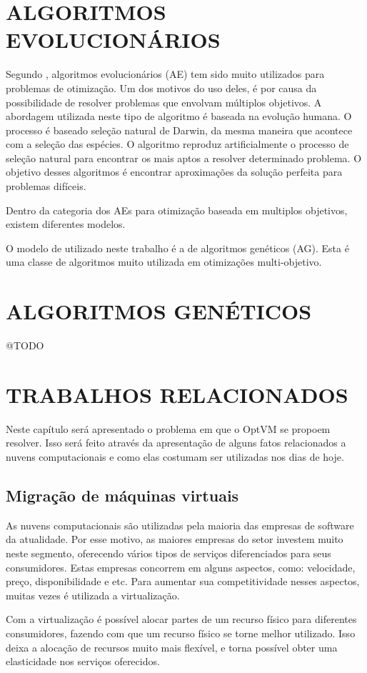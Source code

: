 \section{ALGORITMOS EVOLUCIONÁRIOS}
Segundo \cite{ticona}, algoritmos evolucionários (AE) tem sido muito utilizados para problemas de 
otimização. Um dos motivos do uso deles, é por causa da possibilidade de resolver problemas que 
envolvam múltiplos objetivos. A abordagem utilizada neste tipo de algoritmo é baseada na 
evolução humana. O processo é baseado seleção natural de Darwin, da mesma maneira que acontece com a 
seleção das espécies. O algoritmo reproduz artificialmente o processo de seleção natural para 
encontrar os mais aptos a resolver determinado problema. O objetivo desses algoritmos é 
encontrar aproximações da solução perfeita para problemas difíceis. 

Dentro da categoria dos AEs para otimização baseada em multiplos objetivos, existem diferentes modelos. 

O modelo de utilizado neste trabalho é a de algoritmos genéticos (AG). Esta é uma classe de 
algoritmos muito utilizada em otimizações multi-objetivo. 

\section{ALGORITMOS GENÉTICOS}
@TODO

\section{TRABALHOS RELACIONADOS}
Neste capítulo será apresentado o problema em que o OptVM se propoem resolver. 
Isso será feito através da apresentação de alguns fatos relacionados a nuvens computacionais 
e como elas costumam ser utilizadas nos dias de hoje.

\subsection{Migração de máquinas virtuais}
As nuvens computacionais são utilizadas pela maioria das empresas de software da atualidade. 
Por esse motivo, as maiores empresas do setor investem muito neste segmento, 
oferecendo vários tipos de serviços diferenciados para seus consumidores. 
Estas empresas concorrem em alguns aspectos, como: velocidade, preço, disponibilidade e etc. 
Para aumentar sua competitividade nesses aspectos, muitas vezes é utilizada a virtualização.

Com a virtualização é possível alocar partes de um recurso físico para diferentes consumidores, 
fazendo com que um recurso físico se torne melhor utilizado. Isso deixa a alocação de recursos
muito mais flexível, e torna possível obter uma elasticidade nos serviços oferecidos. 

